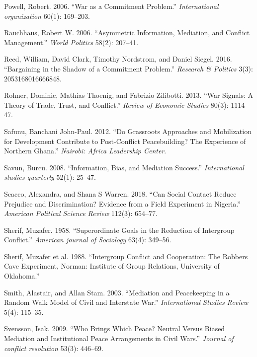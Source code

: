 \documentclass[11pt]{article}
\begin{document}
\hypertarget{ref-powell2006war}{}
Powell, Robert. 2006. ``War as a Commitment Problem.''
\emph{International organization} 60(1): 169--203.

\hypertarget{ref-rauchhaus2006mediation}{}
Rauchhaus, Robert W. 2006. ``Asymmetric Information, Mediation, and
Conflict Management.'' \emph{World Politics} 58(2): 207--41.

\hypertarget{ref-reed2016bargaining}{}
Reed, William, David Clark, Timothy Nordstrom, and Daniel Siegel. 2016.
``Bargaining in the Shadow of a Commitment Problem.'' \emph{Research \&
Politics} 3(3): 2053168016666848.

\hypertarget{ref-rohner2013war}{}
Rohner, Dominic, Mathias Thoenig, and Fabrizio Zilibotti. 2013. ``War
Signals: A Theory of Trade, Trust, and Conflict.'' \emph{Review of
Economic Studies} 80(3): 1114--47.

\hypertarget{ref-safunu2012grassroots}{}
Safunu, Banchani John-Paul. 2012. ``Do Grassroots Approaches and
Mobilization for Development Contribute to Post-Conflict Peacebuilding?
The Experience of Northern Ghana.'' \emph{Nairobi: Africa Leadership
Center}.

\hypertarget{ref-savun2008information}{}
Savun, Burcu. 2008. ``Information, Bias, and Mediation Success.''
\emph{International studies quarterly} 52(1): 25--47.

\hypertarget{ref-scacco2018nigeria}{}
Scacco, Alexandra, and Shana S Warren. 2018. ``Can Social Contact Reduce
Prejudice and Discrimination? Evidence from a Field Experiment in
Nigeria.'' \emph{American Political Science Review} 112(3): 654--77.

\hypertarget{ref-sherif1958superordinate}{}
Sherif, Muzafer. 1958. ``Superordinate Goals in the Reduction of
Intergroup Conflict.'' \emph{American journal of Sociology} 63(4):
349--56.

\hypertarget{ref-Sherif1988robbersCave}{}
Sherif, Muzafer et al. 1988. ``Intergroup Conflict and Cooperation: The
Robbers Cave Experiment, Norman: Institute of Group Relations,
University of Oklahoma.''

\hypertarget{ref-smith2003mediation}{}
Smith, Alastair, and Allan Stam. 2003. ``Mediation and Peacekeeping in a
Random Walk Model of Civil and Interstate War.'' \emph{International
Studies Review} 5(4): 115--35.

\hypertarget{ref-svensson2009brings}{}
Svensson, Isak. 2009. ``Who Brings Which Peace? Neutral Versus Biased
Mediation and Institutional Peace Arrangements in Civil Wars.''
\emph{Journal of conflict resolution} 53(3): 446--69.
\end{document}
